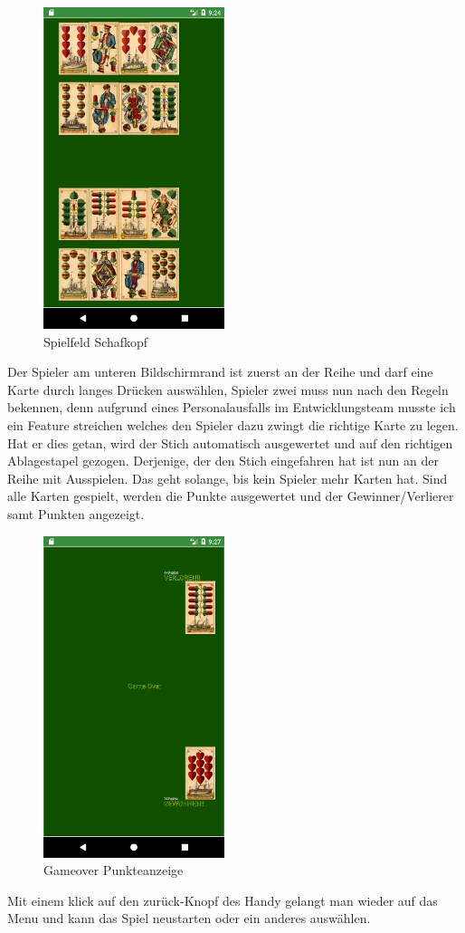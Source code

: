 \begin{figure}[h]
	\centering
	\includegraphics{resources/kartenscreens/board}
	\caption{Spielfeld Schafkopf}
\end{figure}
Der Spieler am unteren Bildschirmrand ist zuerst an der Reihe und darf eine Karte durch langes Drücken auswählen, Spieler zwei muss nun nach den Regeln bekennen, denn aufgrund eines Personalausfalls im Entwicklungsteam musste ich ein Feature streichen welches den Spieler dazu zwingt die richtige Karte zu legen. Hat er dies getan, wird der Stich automatisch ausgewertet und auf den richtigen Ablagestapel gezogen. Derjenige, der den Stich eingefahren hat ist nun an der Reihe mit Ausspielen. Das geht solange, bis kein Spieler mehr Karten hat. Sind alle Karten gespielt, werden die Punkte ausgewertet und der Gewinner/Verlierer samt Punkten angezeigt.
\begin{figure}[h]
	\centering
	\includegraphics{resources/kartenscreens/gameover}
	\caption{Gameover Punkteanzeige}
\end{figure}
Mit einem klick auf den zurück-Knopf des Handy gelangt man wieder auf das Menu und kann das Spiel neustarten oder ein anderes auswählen.

